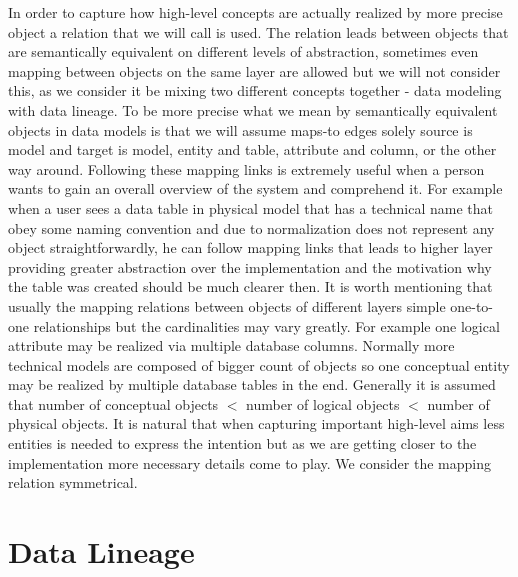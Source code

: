 In order to capture how high-level concepts are actually realized by more precise object a relation that we will call  is used. The relation leads between objects that are semantically equivalent on different levels of abstraction, sometimes even mapping between objects on the same layer are allowed but we will not consider this, as we consider it be mixing two different concepts together - data modeling with data lineage. To be more precise what we mean by semantically equivalent objects in data models is that we will assume maps-to edges solely source is model and target is model, entity and table, attribute and column, or the other way around.
Following these mapping links is extremely useful when a person wants to gain an overall overview of the system and comprehend it. For example when a user sees a data table in physical model that has a technical name that obey some naming convention and due to normalization does not represent any object straightforwardly, he can follow mapping links that leads to higher layer providing greater  abstraction over the implementation and the motivation why the table was created should be much clearer then.
It is worth mentioning that usually the mapping relations between objects of different layers simple one-to-one relationships but the cardinalities may vary greatly. For example one logical attribute may be realized via multiple database columns.
Normally more technical models are composed of bigger count of objects so one conceptual entity may be realized by multiple database tables in the end. Generally it is assumed that number of conceptual objects $<$ number of logical objects $<$ number of physical objects. It is natural that when capturing important high-level aims less entities is needed to express the intention but as we are getting closer to the implementation more necessary details come to play.
We consider the mapping relation symmetrical.

\section{Data Lineage}

